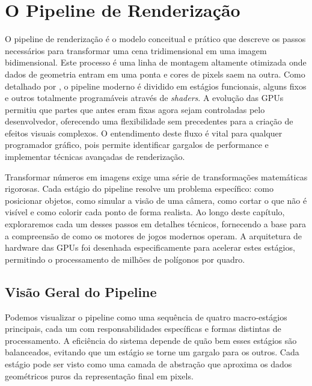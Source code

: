 \chapter{O Pipeline de Renderização}

O pipeline de renderização é o modelo conceitual e prático que descreve os passos necessários para transformar uma cena tridimensional em uma imagem bidimensional. Este processo é uma linha de montagem altamente otimizada onde dados de geometria entram em uma ponta e cores de pixels saem na outra. Como detalhado por \textcite{akenine2018realtime}, o pipeline moderno é dividido em estágios funcionais, alguns fixos e outros totalmente programáveis através de \textit{shaders}. A evolução das GPUs permitiu que partes que antes eram fixas agora sejam controladas pelo desenvolvedor, oferecendo uma flexibilidade sem precedentes para a criação de efeitos visuais complexos. O entendimento deste fluxo é vital para qualquer programador gráfico, pois permite identificar gargalos de performance e implementar técnicas avançadas de renderização.

Transformar números em imagens exige uma série de transformações matemáticas rigorosas. Cada estágio do pipeline resolve um problema específico: como posicionar objetos, como simular a visão de uma câmera, como cortar o que não é visível e como colorir cada ponto de forma realista. Ao longo deste capítulo, exploraremos cada um desses passos em detalhes técnicos, fornecendo a base para a compreensão de como os motores de jogos modernos operam. A arquitetura de hardware das GPUs foi desenhada especificamente para acelerar estes estágios, permitindo o processamento de milhões de polígonos por quadro.

\section{Visão Geral do Pipeline}

Podemos visualizar o pipeline como uma sequência de quatro macro-estágios principais, cada um com responsabilidades específicas e formas distintas de processamento. A eficiência do sistema depende de quão bem esses estágios são balanceados, evitando que um estágio se torne um gargalo para os outros. Cada estágio pode ser visto como uma camada de abstração que aproxima os dados geométricos puros da representação final em pixels.

